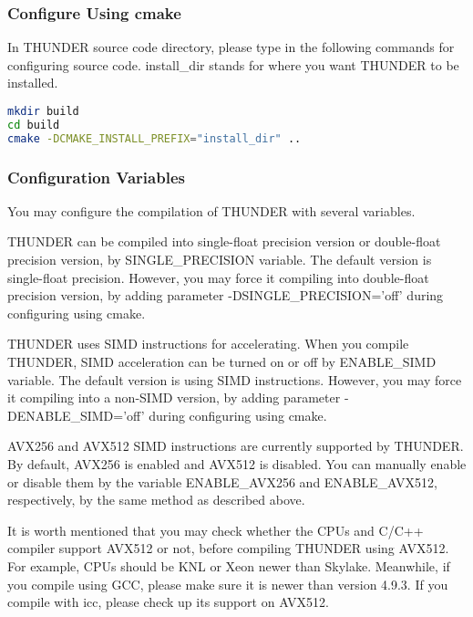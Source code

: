 \documentclass{article}
\begin{document}
            \subsubsection{Configure Using \textsf{cmake}}
            
                In THUNDER source code directory, please type in the following commands for configuring source code. \textsf{install\_dir} stands for where you want THUNDER to be installed.
            
                \begin{lstlisting}[language={sh}]
mkdir build
cd build
cmake -DCMAKE_INSTALL_PREFIX="install_dir" ..
                \end{lstlisting}
                
            \subsubsection{Configuration Variables}
            
                You may configure the compilation of THUNDER with several variables.
                
                THUNDER can be compiled into single-float precision version or double-float precision version, by \textsf{SINGLE\_PRECISION} variable. The default version is single-float precision. However, you may force it compiling into double-float precision version, by adding parameter \textsf{-DSINGLE\_PRECISION='off'} during configuring using \textsf{cmake}.
                
                THUNDER uses SIMD instructions for accelerating. When you compile THUNDER, SIMD acceleration can be turned on or off by \textsf{ENABLE\_SIMD} variable. The default version is using SIMD instructions. However, you may force it compiling into a non-SIMD version, by adding parameter \textsf{-DENABLE\_SIMD='off'} during configuring using \textsf{cmake}.
                
                AVX256 and AVX512 SIMD instructions are currently supported by THUNDER. By default, AVX256 is enabled and AVX512 is disabled. You can manually enable or disable them by the variable \textsf{ENABLE\_AVX256} and \textsf{ENABLE\_AVX512}, respectively, by the same method as described above.
                
                It is worth mentioned that you may check whether the CPUs and C/C++ compiler support AVX512 or not, before compiling THUNDER using AVX512. For example, CPUs should be KNL or Xeon newer than Skylake. Meanwhile, if you compile using \textsf{GCC}, please make sure it is newer than version 4.9.3. If you compile with icc, please check up its support on AVX512.
                
\end{document}
